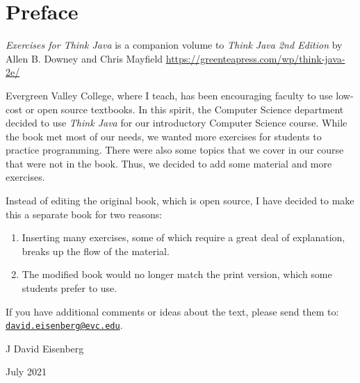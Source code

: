 \chapter*{Preface}


{\it Exercises for Think Java} is a companion volume to {\it Think Java 2nd Edition} by Allen B. Downey and Chris Mayfield 
\url{https://greenteapress.com/wp/think-java-2e/}

Evergreen Valley College, where I teach, has been encouraging faculty to use low-cost or open source textbooks. In this spirit, the Computer Science department decided to use {\it Think Java} for our introductory Computer Science course. While the book met most of our needs, we wanted more exercises for students to practice programming. There were also some topics that we cover in our course that were not in the book. Thus, we decided to add some material and more exercises.

Instead of editing the original book, which is open source, I have decided to make this a separate book for two reasons:

\begin{enumerate}
\item Inserting many exercises, some of which require a great deal of explanation, breaks up the flow of the material. 
\item The modified book would no longer match the print version, which some students prefer to use.
\end{enumerate}


If you have additional comments or ideas about the text, please send them to: \href{mailto:david.eisenberg@evc.edu}{\tt david.eisenberg@evc.edu}.

\hfill J David Eisenberg

\hfill July 2021
